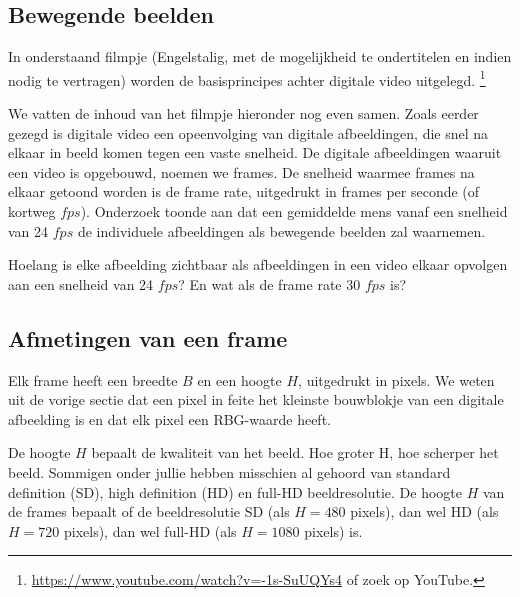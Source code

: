 \subsection{Bewegende beelden}

In onderstaand filmpje (Engelstalig, met de mogelijkheid te ondertitelen en indien nodig te vertragen) worden de basisprincipes achter digitale video uitgelegd. \footnote{\url{https://www.youtube.com/watch?v=-1s-SuUQYs4} of zoek  op YouTube.} 


We vatten de inhoud van het filmpje hieronder nog even samen. Zoals eerder gezegd is digitale video een opeenvolging van digitale afbeeldingen, die snel na elkaar in beeld komen tegen een vaste snelheid.
De digitale afbeeldingen waaruit een video is opgebouwd, noemen we frames.
De snelheid waarmee frames na elkaar getoond worden is de frame rate, uitgedrukt in frames per seconde (of kortweg $fps$).
Onderzoek toonde aan dat een gemiddelde mens vanaf een snelheid van 24 $fps$ de individuele afbeeldingen als bewegende beelden zal waarnemen.

\begin{oef}
	Hoelang is elke afbeelding zichtbaar als afbeeldingen in een video elkaar opvolgen aan een snelheid van 24 $fps$? 
	En wat als de frame rate 30 $fps$ is?
\end{oef}

\subsection{Afmetingen van een frame}

Elk frame heeft een breedte $B$ en een hoogte $H$, uitgedrukt in pixels.
We weten uit de vorige sectie dat een pixel in feite het kleinste bouwblokje van een digitale afbeelding is en dat elk pixel een RBG-waarde heeft.


De hoogte $H$ bepaalt de kwaliteit van het beeld. Hoe groter H, hoe scherper het beeld. Sommigen onder jullie hebben misschien al gehoord van standard definition (SD), high definition (HD) en full-HD beeldresolutie. 
De hoogte $H$ van de frames bepaalt of de beeldresolutie SD (als $H=480$ pixels), dan wel HD (als $H=720$ pixels), dan wel full-HD (als $H=1080$ pixels) is.

